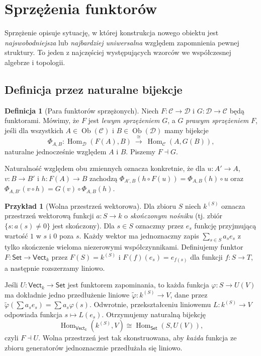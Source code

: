 \documentclass[11pt,a4paper]{article}
\numberwithin{equation}{section}
\theoremstyle{plain}
\theoremstyle{definition}
\newtheorem{definicja}[twierdzenie]{Definicja}
\newtheorem{przyklad}[twierdzenie]{Przykład}
\theoremstyle{remark}
\newcommand{\cat}[1]{\mathsf{#1}}
\newcommand{\Set}{\cat{Set}}
\newcommand{\Vect}{\cat{Vect}}
\newcommand{\Hom}{\operatorname{Hom}}
\newcommand{\Ob}{\operatorname{Ob}}
\begin{document}
\section{Sprzężenia funktorów}\label{sec:adjunctions}

Sprzężenie opisuje sytuację, w której konstrukcja nowego obiektu jest \emph{najswobodniejsza} lub \emph{najbardziej uniwersalna} względem zapomnienia pewnej struktury. To jeden z najczęściej występujących wzorców we współczesnej algebrze i topologii.

\subsection{Definicja przez naturalne bijekcje}

\begin{definicja}[Para funktorów sprzężonych]\label{def:adjunction}
Niech $F:\mathcal C\to\mathcal D$ i $G:\mathcal D\to\mathcal C$ będą funktorami. Mówimy, że $F$ jest \emph{lewym sprzężeniem} $G$, a $G$ \emph{prawym sprzężeniem} $F$, jeśli dla wszystkich $A\in\Ob(\mathcal C)$ i $B\in\Ob(\mathcal D)$ mamy bijekcje
\[
\Phi_{A,B}:\Hom_{\mathcal D}(F(A),B)\ \overset{\cong}{\longrightarrow}\ \Hom_{\mathcal C}(A,G(B)),
\]
naturalne jednocześnie względem $A$ i $B$. Piszemy $F\dashv G$.
\end{definicja}

Naturalność względem obu zmiennych oznacza konkretnie, że dla $u:A'\to A$, $v:B\to B'$ i $h:F(A)\to B$ zachodzą
$\Phi_{A',B}(h\circ F(u))=\Phi_{A,B}(h)\circ u$ oraz $\Phi_{A,B'}(v\circ h)=G(v)\circ\Phi_{A,B}(h)$.

\begin{przyklad}[Wolna przestrzeń wektorowa]\label{przyklad:free-vect}
Dla zbioru $S$ niech $k^{(S)}$ oznacza przestrzeń wektorową funkcji $a:S\to k$ o \emph{skończonym nośniku} (tj. zbiór $\{s:a(s)\neq0\}$ jest skończony). Dla $s\in S$ oznaczmy przez $e_s$ funkcję przyjmującą wartość $1$ w $s$ i $0$ poza $s$. Każdy wektor ma jednoznaczny zapis $\sum_{s\in S}a_s e_s$ z tylko skończenie wieloma niezerowymi współczynnikami. Definiujemy funktor $F:\Set\to\Vect_k$ przez $F(S)=k^{(S)}$ i $F(f)(e_s)=e_{f(s)}$ dla funkcji $f:S\to T$, a następnie rozszerzamy liniowo.

Jeśli $U:\Vect_k\to\Set$ jest funktorem zapominania, to każda funkcja $\varphi:S\to U(V)$ ma dokładnie jedno przedłużenie liniowe $\widetilde\varphi:k^{(S)}\to V$, dane przez $\widetilde\varphi(\sum a_s e_s)=\sum a_s\varphi(s)$. Odwrotnie, przekształceniu liniowemu $L:k^{(S)}\to V$ odpowiada funkcja $s\mapsto L(e_s)$. Otrzymujemy naturalną bijekcję
\[
\Hom_{\Vect_k}(k^{(S)},V)\cong\Hom_{\Set}(S,U(V)),
\]
czyli $F\dashv U$. Wolna przestrzeń jest tak skonstruowana, aby \emph{każda} funkcja ze zbioru generatorów jednoznacznie przedłużała się liniowo.
\end{przyklad}
\end{document}
